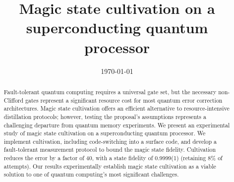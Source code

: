 \documentclass[%
 reprint,
 amsmath,amssymb,
 aps,
]{revtex4-2}
\begin{document}
\title{Magic state cultivation on a superconducting quantum processor}
\date{\today}
\begin{abstract}
Fault-tolerant quantum computing requires a universal gate set, but the necessary non-Clifford gates represent a significant resource cost for most quantum error correction architectures. Magic state cultivation offers an efficient alternative to resource-intensive distillation protocols; however, testing the proposal’s assumptions represents a challenging departure from quantum memory experiments. We present an experimental study of magic state cultivation on a superconducting quantum processor. We implement cultivation, including code-switching into a surface code, and develop a fault-tolerant measurement protocol to bound the magic state fidelity. Cultivation reduces the error by a factor of 40, with a state fidelity of 0.9999(1) (retaining 8\% of attempts). Our results experimentally establish magic state cultivation as a viable solution to one of quantum computing's most significant challenges.
\end{abstract}
\maketitle
\onecolumngrid
\end{document}
